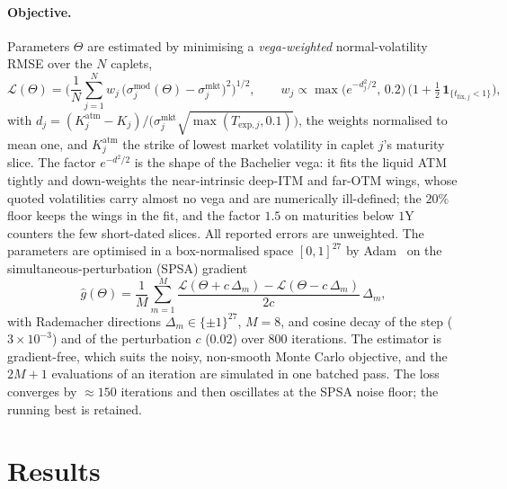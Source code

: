 \documentclass[11pt]{article}
\begin{document}
\paragraph{Objective.} Parameters \(\Theta\) are estimated by minimising a \emph{vega-weighted}
normal-volatility RMSE over the \(N\) caplets,
\begin{equation}
\mathcal{L}(\Theta)=\Big(\frac{1}{N}\sum_{j=1}^{N} w_j\,
\big(\sigma^{\text{mod}}_j(\Theta)-\sigma^{\text{mkt}}_j\big)^2\Big)^{1/2},
\qquad
w_j\propto\max\!\big(e^{-d_j^2/2},\,0.2\big)\,\big(1+\tfrac12\,\mathbf{1}_{\{t_{\text{fix},j}<1\}}\big),
\end{equation}
with \(d_j=(K^{\text{atm}}_j-K_j)\big/\big(\sigma^{\text{mkt}}_j\sqrt{\max(T_{\text{exp},j},0.1)}\big)\),
the weights normalised to mean one, and \(K^{\text{atm}}_j\) the strike of lowest market volatility
in caplet \(j\)'s maturity slice. The factor \(e^{-d^2/2}\) is the shape of the Bachelier vega:
it fits the liquid ATM tightly and down-weights the near-intrinsic deep-ITM and far-OTM wings, whose
quoted volatilities carry almost no vega and are numerically ill-defined; the \(20\%\) floor keeps
the wings in the fit, and the factor \(1.5\) on maturities below \(1\)Y counters the few short-dated
slices. All reported errors are unweighted. The parameters are optimised in a box-normalised space
\([0,1]^{27}\) by Adam~\cite{kingma2015} on the simultaneous-perturbation (SPSA)
gradient~\cite{spall1998}
\begin{equation}
\hat g(\Theta)=\frac{1}{M}\sum_{m=1}^{M}
\frac{\mathcal{L}(\Theta+c\,\Delta_m)-\mathcal{L}(\Theta-c\,\Delta_m)}{2c}\,\Delta_m ,
\end{equation}
with Rademacher directions \(\Delta_m\in\{\pm1\}^{27}\), \(M=8\), and cosine decay of the step
(\(3\times10^{-3}\)) and of the perturbation \(c\) (\(0.02\)) over \(800\) iterations. The estimator
is gradient-free, which suits the noisy, non-smooth Monte Carlo objective, and the \(2M+1\)
evaluations of an iteration are simulated in one batched pass. The loss converges by
\(\approx 150\) iterations and then oscillates at the SPSA noise floor; the running best is
retained.

\section{Results}
\end{document}
